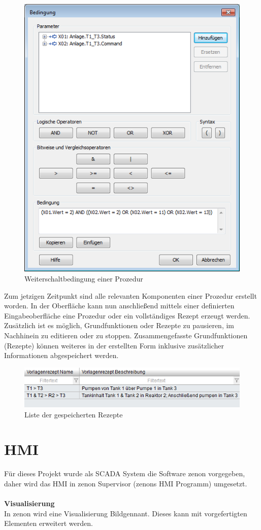 \begin{figure}[h!]
  \centering
  \includegraphics[height=0.8\textwidth]{graphics/implementation/weiterschaltbedingung}
  \caption{Weiterschaltbedingung einer Prozedur}
  \label{fig:weiterschaltbedingung}
\end{figure}

Zum jetzigen Zeitpunkt sind alle relevanten Komponenten einer Prozedur erstellt worden. In der Oberfläche kann nun anschließend mittels einer definierten Eingabeoberfläche eine Prozedur oder ein vollständiges Rezept erzeugt werden. Zusätzlich ist es möglich, Grundfunktionen oder Rezepte zu pausieren, im Nachhinein zu editieren oder zu stoppen. Zusammengefasste Grundfunktionen (Rezepte) können weiteres in der erstellten Form inklusive zusätzlicher Informationen abgespeichert werden.

\begin{figure}[h!]
  \centering
  \includegraphics[width=1\textwidth]{graphics/implementation/rezepte_liste}
  \caption{Liste der gespeicherten Rezepte}
  \label{fig:rezepte_list}
\end{figure}
	
\section{\ac{HMI}}
Für dieses Projekt wurde als SCADA System die Software zenon vorgegeben, daher wird das \ac{HMI} in zenon Supervisor (zenons \ac{HMI} Programm) umgesetzt.\\
\\
\textbf{Visualisierung}\\
In zenon wird eine Visualisierung \glqq Bild\grqq\space  gennant. Dieses kann mit vorgefertigten Elementen erweitert werden. 

